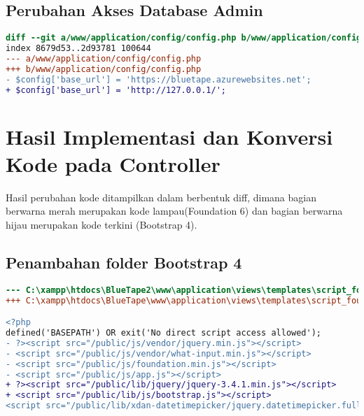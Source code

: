 \subsection{Perubahan Akses Database Admin}
\begin{lstlisting}[language=diff, caption=Perubahan Akses Database Admin, label=Entri, basicstyle=\ttfamily, frame=single,
columns=fullflexible, keepspaces=true, breaklines=true]
diff --git a/www/application/config/config.php b/www/application/config/config.php
index 8679d53..2d93781 100644
--- a/www/application/config/config.php
+++ b/www/application/config/config.php
- $config['base_url'] = 'https://bluetape.azurewebsites.net';
+ $config['base_url'] = 'http://127.0.0.1/';
\end{lstlisting}

\section{Hasil Implementasi dan Konversi Kode pada Controller}
Hasil perubahan kode ditampilkan dalam berbentuk diff, dimana bagian berwarna merah merupakan kode lampau(Foundation 6) dan bagian berwarna hijau merupakan kode terkini  (Bootstrap 4). 
\subsection{Penambahan folder Bootstrap 4}
\begin{lstlisting}[language=diff, caption=Penambahan library js, label=Entri, basicstyle=\ttfamily, frame=single,
columns=fullflexible, keepspaces=true, breaklines=true]
--- C:\xampp\htdocs\BlueTape2\www\application\views\templates\script_foundation.php	
+++ C:\xampp\htdocs\BlueTape\www\application\views\templates\script_foundation.php	

<?php
defined('BASEPATH') OR exit('No direct script access allowed');
- ?><script src="/public/js/vendor/jquery.min.js"></script>
- <script src="/public/js/vendor/what-input.min.js"></script>
- <script src="/public/js/foundation.min.js"></script>
- <script src="/public/js/app.js"></script>
+ ?><script src="/public/lib/jquery/jquery-3.4.1.min.js"></script>
+ <script src="/public/lib/js/bootstrap.js"></script>
<script src="/public/lib/xdan-datetimepicker/jquery.datetimepicker.full.min.js"></script>
\end{lstlisting}


